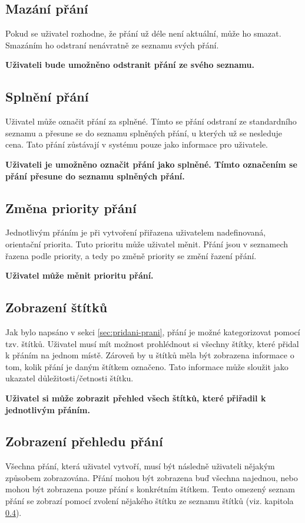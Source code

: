 \subsection{Mazání přání}
Pokud se uživatel rozhodne, že přání už déle není aktuální, může ho smazat. Smazáním ho odstraní nenávratně ze seznamu svých přání.

\textbf{Uživateli bude umožněno odstranit přání ze svého seznamu.}

\subsection{Splnění přání}
Uživatel může označit přání za splněné. Tímto se přání odstraní ze standardního seznamu a přesune se do seznamu splněných přání, u kterých už se nesleduje cena. Tato přání zůstávají v systému pouze jako informace pro uživatele.

\textbf{Uživateli je umožněno označit přání jako splněné. Tímto označením se přání přesune do seznamu splněných přání.}

\subsection{Změna priority přání}
Jednotlivým přáním je při vytvoření přiřazena uživatelem nadefinovaná, orientační priorita. Tuto prioritu může uživatel měnit. Přání jsou v seznamech řazena podle priority, a tedy po změně priority se změní řazení přání.

\textbf{Uživatel může měnit prioritu přání.}

\subsection{Zobrazení štítků}
\label{sec:zobrazeni-stitku}
Jak bylo napsáno v sekci \ref{sec:pridani-prani}, přání je možné kategorizovat pomocí tzv. štítků. Uživatel musí mít možnost prohlédnout si všechny štítky, které přidal k přáním na jednom místě. Zároveň by u štítků měla být zobrazena informace o tom, kolik přání je daným štítkem označeno. Tato informace může sloužit jako ukazatel důležitosti/četnosti štítku.

\textbf{Uživatel si může zobrazit přehled všech štítků, které přiřadil k jednotlivým přáním.}

\subsection{Zobrazení přehledu přání}
Všechna přání, která uživatel vytvoří, musí být následně uživateli nějakým způsobem zobrazována. Přání mohou být zobrazena buď všechna najednou, nebo mohou být zobrazena pouze přání s konkrétním štítkem. Tento omezený seznam přání se zobrazí pomocí zvolení nějakého štítku ze seznamu štítků (viz. kapitola \ref{sec:zobrazeni-stitku}).

